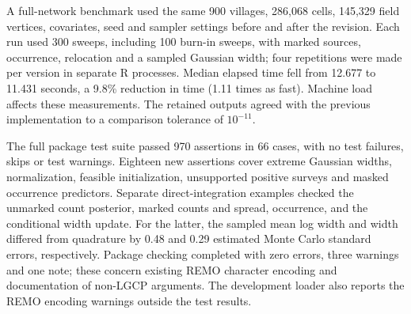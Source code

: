 A full-network benchmark used the same 900 villages, 286,068 cells, 145,329 field vertices, covariates, seed and sampler settings before and after the revision. Each run used 300 sweeps, including 100 burn-in sweeps, with marked sources, occurrence, relocation and a sampled Gaussian width; four repetitions were made per version in separate R processes. Median elapsed time fell from 12.677 to 11.431 seconds, a 9.8\% reduction in time (1.11 times as fast). Machine load affects these measurements. The retained outputs agreed with the previous implementation to a comparison tolerance of $10^{-11}$.

The full package test suite passed 970 assertions in 66 cases, with no test failures, skips or test warnings. Eighteen new assertions cover extreme Gaussian widths, normalization, feasible initialization, unsupported positive surveys and masked occurrence predictors. Separate direct-integration examples checked the unmarked count posterior, marked counts and spread, occurrence, and the conditional width update. For the latter, the sampled mean log width and width differed from quadrature by 0.48 and 0.29 estimated Monte Carlo standard errors, respectively. Package checking completed with zero errors, three warnings and one note; these concern existing REMO character encoding and documentation of non-LGCP arguments. The development loader also reports the REMO encoding warnings outside the test results.
